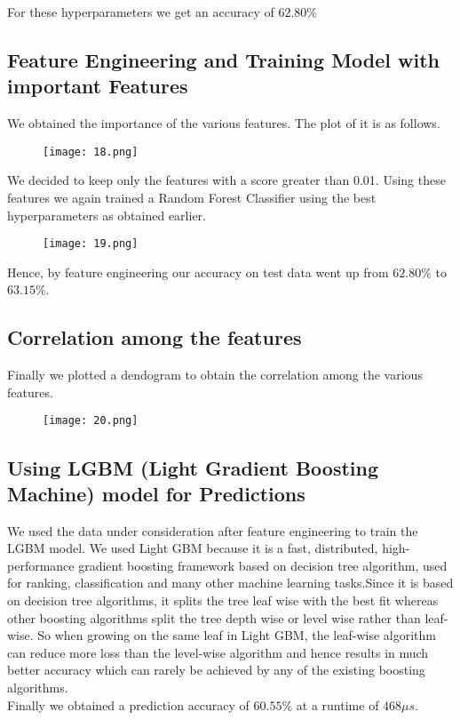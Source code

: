 \documentclass[conference]{IEEEtran}
\begin{document}
For these hyperparameters we get an accuracy of $62.80 \%$

\subsection{Feature Engineering and Training Model with important Features}

We obtained the importance of the various features. The plot of it is as follows.
\begin{figure}[H]
    \centering
    \texttt{[image: 18.png]}
\end{figure}

We decided to keep only the features with a score greater than 0.01. Using these features we again trained a Random Forest Classifier using the best hyperparameters as obtained earlier.
\begin{figure}[H]
    \centering
    \texttt{[image: 19.png]}
\end{figure}

Hence, by feature engineering our accuracy on test data went up from $62.80 \%$ to $63.15 \%$.

\subsection{Correlation among the features}
Finally we plotted a dendogram to obtain the correlation among the various features.
\begin{figure}[H]
    \centering
    \texttt{[image: 20.png]}
\end{figure}

\subsection{Using LGBM (Light Gradient Boosting Machine) model for Predictions}
We used the data under consideration after feature engineering to train the LGBM model. We used Light GBM  because it is a fast, distributed, high-performance gradient boosting framework based on decision tree algorithm, used for ranking, classification and many other machine learning tasks.Since it is based on decision tree algorithms, it splits the tree leaf wise with the best fit whereas other boosting algorithms split the tree depth wise or level wise rather than leaf-wise. So when growing on the same leaf in Light GBM, the leaf-wise algorithm can reduce more loss than the level-wise algorithm and hence results in much better accuracy which can rarely be achieved by any of the existing boosting algorithms. \\
Finally we obtained a prediction accuracy of $\mathbf{60.55 \%}$ at a runtime of $468 \mu s$.
\end{document}
